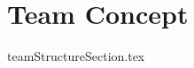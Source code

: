 \documentclass[class=book , crop=false]{standalone}
\begin{document}
\chapter{Team Concept}
{teamStructureSection.tex}
\clearpage
\end{document}
